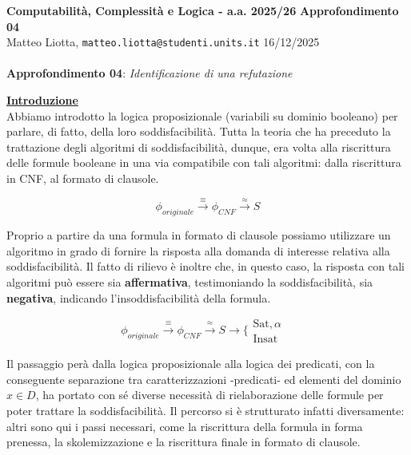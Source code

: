 \documentclass[a4paper,10pt]{article}
\newcommand{\EsercitazioneNum}{04}
\newcommand{\Data}{16/12/2025}
\begin{document}
\footnotesize  %

\noindent
\small \textbf{Computabilità, Complessità e Logica - a.a. 2025/26} \hfill \textbf{Approfondimento \EsercitazioneNum} \\[0.2cm]
\scriptsize Matteo Liotta, \texttt{matteo.liotta@studenti.units.it} \hfill \Data \\[0.2cm]

\noindent\makebox[\linewidth]{\rule{\linewidth}{0.4pt}} \\[1cm]


\noindent\Large \textbf{Approfondimento \EsercitazioneNum}: \textit{Identificazione di una refutazione}\\[0.1cm]



\small

\underline{\textbf{Introduzione}}\\

Abbiamo introdotto la logica proposizionale (variabili su dominio booleano) per parlare, di fatto, della loro soddisfacibilità. Tutta la teoria che ha preceduto la trattazione degli algoritmi di soddisfacibilità, dunque, era volta alla riscrittura delle formule booleane in una via compatibile con tali algoritmi: dalla riscrittura in CNF, al formato di clausole.

$$\phi_{originale}\overset{\equiv}{\longrightarrow}\phi_{CNF}\overset{\approx}{\longrightarrow}S$$

Proprio a partire da una formula in formato di clausole possiamo utilizzare un algoritmo in grado di fornire la risposta alla domanda di interesse relativa alla soddisfacibilità. Il fatto di rilievo è inoltre che, in questo caso, la risposta con tali algoritmi può essere sia \textbf{affermativa}, testimoniando la soddisfacibilità, sia \textbf{negativa}, indicando l'insoddisfacibilità della formula. 

$$\phi_{originale}\overset{\equiv}{\longrightarrow}\phi_{CNF}\overset{\approx}{\longrightarrow}S\longrightarrow\bigg\{\begin{array}{cc}
    \text{Sat},\alpha &  \\
    \text{Insat} & 
\end{array}$$

Il passaggio perà dalla logica proposizionale alla logica dei predicati, con la conseguente separazione tra caratterizzazioni -predicati- ed elementi del dominio $x\in D$, ha portato con sé diverse necessità di rielaborazione delle formule per poter trattare la soddisfacibilità. Il percorso si è strutturato infatti diversamente: altri sono qui i passi necessari, come la riscrittura della formula in forma prenessa, la skolemizzazione e la riscrittura finale in formato di clausole.
\end{document}
